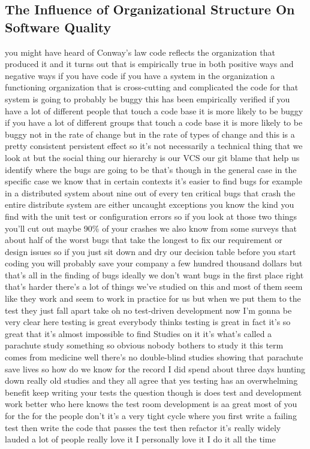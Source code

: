 \documentclass[conference, compsoc, twoside]{IEEEtran}
\begin{document}
\subsection{The Influence of Organizational Structure On Software Quality}
you might have heard of Conway's law code reflects
the organization that produced it and it
turns out that is empirically true in
both positive ways and negative ways if
you have code if you have a system in
the organization a functioning
organization that is cross-cutting and
complicated the code for that system is
going to probably be buggy this has been empirically verified if you have a lot of different people that touch a code
base it is more likely to be buggy if
you have a lot of different groups that
touch a code base it is more likely to
be buggy not in the rate of change but
in the rate of types of change and this
is a pretty consistent persistent effect
so it's not necessarily a technical
thing that we look at but the social
thing our hierarchy is our VCS our git
blame that help us identify where the
bugs are going to be that's though in
the general case in the specific case we
know that in certain contexts it's
easier to find bugs for example in a
distributed system about nine out of
every ten critical bugs that crash the
entire distribute system are either
uncaught exceptions you know the kind
you find with the unit test or
configuration errors so if you look at
those two things you'll cut out maybe
90\% of your crashes we also know from
some surveys that about half of the
worst bugs that take the longest to fix
our requirement or design issues so if
you just sit down and dry our decision
table before you start coding you will
probably save your company a few hundred
thousand dollars
but that's all in the finding of bugs
ideally we don't want bugs in the first
place right that's harder there's a lot
of things we've studied on this and most
of them seem like they work and seem to
work in practice for us but when we put
them to the test
they just fall apart take oh no
test-driven development now I'm gonna be
very clear here testing is great
everybody thinks testing is great in
fact it's so great that it's almost
impossible to find Studies on it it's
what's called a parachute study
something so obvious nobody bothers to
study it this term comes from medicine
well there's no double-blind studies
showing that parachute save lives so how
do we know for the record 
I did spend about three days hunting down really old
studies and they all agree that yes testing has an overwhelming benefit keep
writing your tests the question though
is does test and development work better
who here knows the test room development
is aa great most of you for the for the
people don't it's a very tight cycle
where you first write a failing test
then write the code that passes the test
then refactor it's really widely lauded
a lot of people really love it I
personally love it I do it all the time
\end{document}
